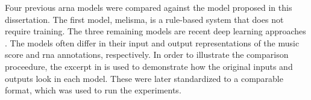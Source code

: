 
Four previous \gls{arna} models were compared against the
model proposed in this dissertation. The first model,
\gls{melisma}, is a rule-based system that does not require
training. The three remaining models are recent deep
learning approaches \parencite{chen2021attend,
micchi2021deep, mcleod2021modular}. The models often differ
in their input and output representations of the music score
and \gls{rna} annotations, respectively. In order to
illustrate the comparison proceedure, the excerpt in
 is used to demonstrate
how the original inputs and outputs look in each model.
These were later standardized to a comparable format, which
was used to run the experiments.

